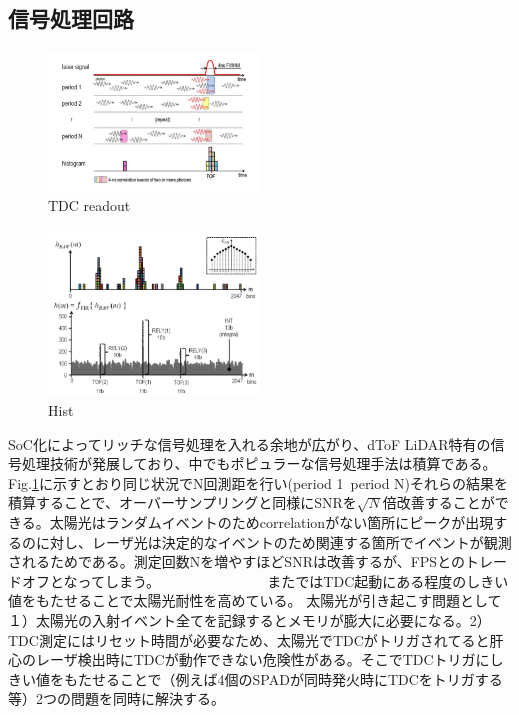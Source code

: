 \documentclass[letterpaper, 10 pt, conference]{ieeeconf}  %
\begin{document}
\subsection{信号処理回路}
\begin{figure}[!t]
\centering
 \includegraphics[width=0.5\textwidth]{figs/threshold.png}
  \caption{TDC readout \cite{niclass2012100}}
\label{tdc}
\end{figure}

\begin{figure}[!t]
\centering
 \includegraphics[width=0.5\textwidth]{figs/hist.png}
  \caption{Hist \cite{niclass2012100}}
\label{hist}
\end{figure}

SoC化によってリッチな信号処理を入れる余地が広がり、dToF LiDAR特有の信号処理技術が発展しており、中でもポピュラーな信号処理手法は積算である。Fig.\ref{tdc}に示すとおり同じ状況でN回測距を行い(period 1~period N)それらの結果を積算することで、オーバーサンプリングと同様にSNRを$\sqrt{N}$倍改善することができる。太陽光はランダムイベントのためcorrelationがない箇所にピークが出現するのに対し、レーザ光は決定的なイベントのため関連する箇所でイベントが観測されるためである。測定回数Nを増やすほどSNRは改善するが、FPSとのトレードオフとなってしまう。
　　　　　　　
また\cite{niclass2012100}ではTDC起動にある程度のしきい値をもたせることで太陽光耐性を高めている。
太陽光が引き起こす問題として１）太陽光の入射イベント全てを記録するとメモリが膨大に必要になる。2）TDC測定にはリセット時間が必要なため、太陽光でTDCがトリガされてると肝心のレーザ検出時にTDCが動作できない危険性がある。そこでTDCトリガにしきい値をもたせることで（例えば4個のSPADが同時発火時にTDCをトリガする等）2つの問題を同時に解決する。
\end{document}
